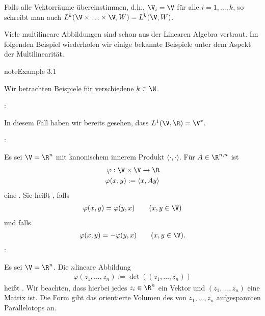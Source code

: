 \documentclass[letterpaper,10pt,english]{jupyterBook}
\begin{document}
\sphinxAtStartPar
Falls alle Vektorräume übereinstimmen, d.h., \(\V_i = \V\) für alle \(i=1,\ldots,k\), so schreibt man auch \(L^k(\V\times\ldots\times \V,W) = L^k(\V,W)\).

\sphinxAtStartPar
Viele multilineare Abbildungen sind schon aus der Linearen Algebra vertraut. Im folgenden Beispiel wiederholen wir einige bekannte Beispiele unter dem Aspekt der Multilinearität.
\label{vektoranalysis/multilinear:ex:multi}
\begin{sphinxadmonition}{note}{Example 3.1}



\sphinxAtStartPar
Wir betrachten Beispiele für verschiedene \(k\in\N\).

\sphinxAtStartPar
{}:

\sphinxAtStartPar
In diesem Fall haben wir bereits gesehen, dass \(L^1(\V,\R) = \V^\ast\).

\sphinxAtStartPar
{}:

\sphinxAtStartPar
Es sei \(\V=\R^n\) mit kanonischem innerem Produkt \(\langle\cdot,\cdot\rangle\). Für \(A\in\R^{n,n}\) ist
\begin{equation*}
\begin{split}\varphi:\V\times \V\to\R\\ 
\varphi(x, y) :=\langle x,A y \rangle\end{split}
\end{equation*}
\sphinxAtStartPar
eine . Sie heißt ,
falls
\begin{equation*}
\begin{split}\varphi(x, y) = \varphi( y, x)\qquad (x, y\in \V)\end{split}
\end{equation*}
\sphinxAtStartPar
und  falls
\begin{equation*}
\begin{split}\varphi(x, y) = -\varphi( y, x)\qquad (x, y\in \V).\end{split}
\end{equation*}
\sphinxAtStartPar
{}:

\sphinxAtStartPar
Es sei \(\V=\R^n\). Die \(n\)\sphinxhyphen{}lineare Abbildung
\begin{equation*}
\begin{split}\varphi(z_1,\ldots,z_n) := \det((z_1,\ldots,z_n))\end{split}
\end{equation*}
\sphinxAtStartPar
heißt . Wir beachten, dass hierbei jedes \(z_i\in\R^n\) ein Vektor und \((z_1,\ldots,z_n)\) eine Matrix ist.
Die Form gibt das orientierte Volumen des von \(z_1,\ldots,z_n\) aufgespannten Parallelotops an.
\end{sphinxadmonition}
\end{document}

